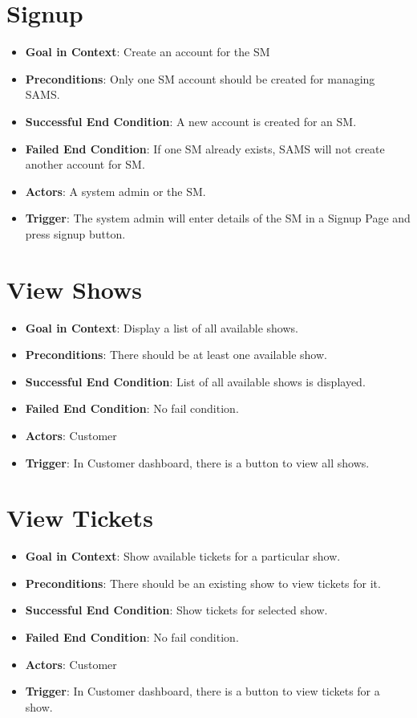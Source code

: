 \documentclass{scrreprt}
\begin{document}
\section{Signup}
\begin{itemize}
\item \textbf{Goal in Context}: Create an account for the SM
\item \textbf{Preconditions}: Only one SM account should be created for managing SAMS.
\item \textbf{Successful End Condition}: A new account is created for an SM. 
\item \textbf{Failed End Condition}: If one SM already exists, SAMS will not create another account for SM.
\item \textbf{Actors}: A system admin or the SM. 
\item \textbf{Trigger}: The system admin will enter details of the SM in a Signup Page and press signup button. 
\end{itemize}


\section{View Shows}
\begin{itemize}
\item \textbf{Goal in Context}: Display a list of all available shows.
\item \textbf{Preconditions}: There should be at least one available show.
\item \textbf{Successful End Condition}: List of all available shows is displayed.
\item \textbf{Failed End Condition}: No fail condition. 
\item \textbf{Actors}: Customer
\item \textbf{Trigger}: In Customer dashboard, there is a button to view all shows.
\end{itemize}


\section{View Tickets}
\begin{itemize}
\item \textbf{Goal in Context}: Show available tickets for a particular show.
\item \textbf{Preconditions}: There should be an existing show to view tickets for it.
\item \textbf{Successful End Condition}: Show tickets for selected show. 
\item \textbf{Failed End Condition}: No fail condition.
\item \textbf{Actors}: Customer
\item \textbf{Trigger}: In Customer dashboard, there is a button to view tickets for a show.
\end{itemize}
\end{document}
